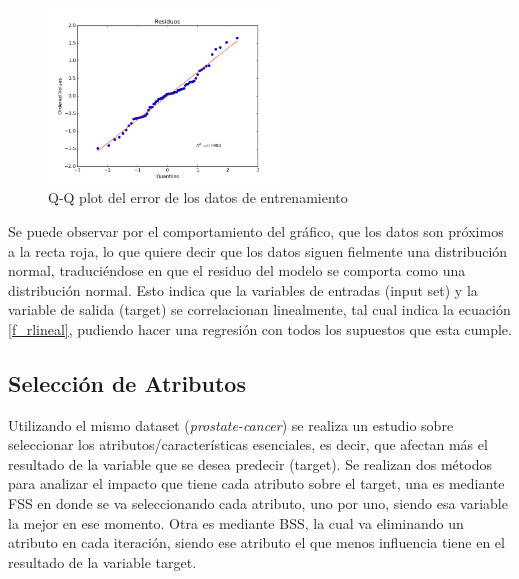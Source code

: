 \documentclass[10pt]{article}
\begin{document}
\begin{itemize}
\begin{figure}[h]
   \centering
   \includegraphics[width=0.55\textwidth]{images/qqplot}
   \caption{Q-Q plot del error de los datos de entrenamiento}
   \label{fig:mesh1}
\end{figure}

Se puede observar por el comportamiento del gráfico, que los datos son próximos a la recta roja, lo que quiere decir que los datos siguen fielmente una distribución normal, traduciéndose en que el residuo del modelo se comporta como una distribución normal. Esto indica que la variables de entradas (input set) y la variable de salida (target) se correlacionan linealmente, tal cual indica la ecuación \eqref{f_rlineal}, pudiendo hacer una regresión con todos los supuestos que esta cumple.

\end{itemize}
\newpage
\subsection{Selección de Atributos}
Utilizando el mismo dataset (\textit{prostate-cancer}) se realiza un estudio sobre seleccionar los atributos/características esenciales, es decir, que afectan más el resultado de la variable que se desea predecir (target). Se realizan dos métodos para analizar el impacto que tiene cada atributo sobre el target, una es mediante FSS en donde se va seleccionando cada atributo, uno por uno, siendo esa variable la mejor en ese momento. Otra es mediante BSS, la cual va eliminando un atributo en cada iteración, siendo ese atributo el que menos influencia tiene en el resultado de la variable target.
\end{document}
